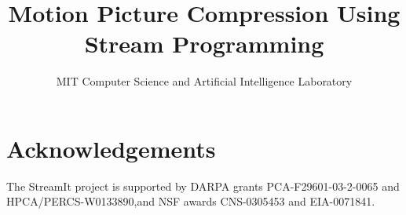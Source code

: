 \documentclass[times,12pt,onecolumn]{article}
\title{Motion Picture Compression Using Stream Programming}
\author{
  MIT Computer Science and Artificial Intelligence Laboratory
}
\date{}
\begin{document}
\maketitle
\thispagestyle{empty}

\begin{abstract}

\end{abstract}











\section*{Acknowledgements}
The StreamIt project is supported by DARPA grants PCA-F29601-03-2-0065
and HPCA/PERCS-W0133890,and NSF awards CNS-0305453 and EIA-0071841.



\end{document}
